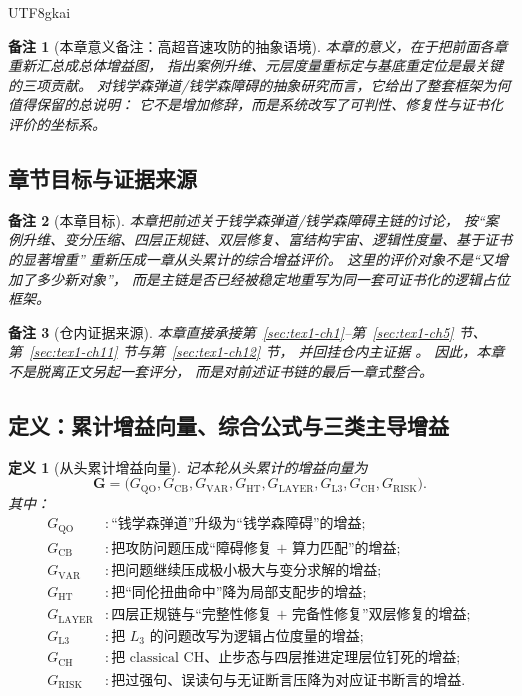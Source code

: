 \documentclass[12pt]{article}
\newtheorem{definition}{定义}[section]
\newtheorem{remark}{备注}[section]
\begin{document}
\begin{CJK*}{UTF8}{gkai}
\begin{remark}[本章意义备注：高超音速攻防的抽象语境]
本章的意义，在于把前面各章重新汇总成总体增益图，
指出案例升维、元层度量重标定与基底重定位是最关键的三项贡献。
对钱学森弹道/钱学森障碍的抽象研究而言，它给出了整套框架为何值得保留的总说明：
它不是增加修辞，而是系统改写了可判性、修复性与证书化评价的坐标系。
\end{remark}

\subsection{章节目标与证据来源}
\label{subsec:tex1-ch6-goal}

\begin{remark}[本章目标]
本章把前述关于钱学森弹道/钱学森障碍主链的讨论，
按“案例升维、变分压缩、四层正规链、双层修复、富结构宇宙、逻辑性度量、基于证书的显著增重”
重新压成一章从头累计的综合增益评价。
这里的评价对象不是“又增加了多少新对象”，
而是主链是否已经被稳定地重写为同一套可证书化的逻辑占位框架。
\end{remark}

\begin{remark}[仓内证据来源]
本章直接承接第~\ref{sec:tex1-ch1}--第~\ref{sec:tex1-ch5} 节、
第~\ref{sec:tex1-ch11} 节与第~\ref{sec:tex1-ch12} 节，
并回挂仓内主证据
\cite{RepoTex36HomotopyTwistEquivalence,RepoTex38JacobiBianchiRepair,RepoTex41HomotopyRepairBundle,RepoMetaGMSAxiom}。
因此，本章不是脱离正文另起一套评分，
而是对前述证书链的最后一章式整合。
\end{remark}

\subsection{定义：累计增益向量、综合公式与三类主导增益}
\label{subsec:tex1-ch6-defs}

\begin{definition}[从头累计增益向量]
\label{def:tex1-ch6-gain-vector}
记本轮从头累计的增益向量为
\[
  \mathbf G
  =
  \bigl(
  G_{\mathrm{QO}},
  G_{\mathrm{CB}},
  G_{\mathrm{VAR}},
  G_{\mathrm{HT}},
  G_{\mathrm{LAYER}},
  G_{\mathrm{L3}},
  G_{\mathrm{CH}},
  G_{\mathrm{RISK}}
  \bigr).
\]
其中：
\[
\begin{aligned}
  G_{\mathrm{QO}} &: \text{“钱学森弹道”升级为“钱学森障碍”的增益};\\
  G_{\mathrm{CB}} &: \text{把攻防问题压成“障碍修复 + 算力匹配”的增益};\\
  G_{\mathrm{VAR}} &: \text{把问题继续压成极小极大与变分求解的增益};\\
  G_{\mathrm{HT}} &: \text{把“同伦扭曲命中”降为局部支配步的增益};\\
  G_{\mathrm{LAYER}} &: \text{四层正规链与“完整性修复 + 完备性修复”双层修复的增益};\\
  G_{\mathrm{L3}} &: \text{把 }L_3\text{ 的问题改写为逻辑占位度量的增益};\\
  G_{\mathrm{CH}} &: \text{把 classical CH、止步态与四层推进定理层位钉死的增益};\\
  G_{\mathrm{RISK}} &: \text{把过强句、误读句与无证断言压降为对应证书断言的增益}.
\end{aligned}
\]
\end{definition}


\end{CJK*}
\end{document}
